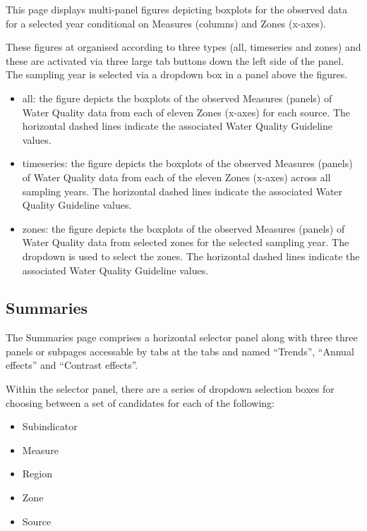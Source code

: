 \documentclass[
  8pt,
  a4paper]{article}
\providecommand{\tightlist}{%
  \setlength{\itemsep}{0pt}\setlength{\parskip}{0pt}}
\begin{document}
This page displays multi-panel figures depicting boxplots for the
observed data for a selected year conditional on Measures (columns) and
Zones (x-axes).

These figures at organised according to three types (all, timeseries and
zones) and these are activated via three large tab buttons down the left
side of the panel. The sampling year is selected via a dropdown box in a
panel above the figures.

\begin{itemize}
\tightlist
\item
  all: the figure depicts the boxplots of the observed Measures (panels)
  of Water Quality data from each of eleven Zones (x-axes) for each
  source. The horizontal dashed lines indicate the associated Water
  Quality Guideline values.
\item
  timeseries: the figure depicts the boxplots of the observed Measures
  (panels) of Water Quality data from each of the eleven Zones (x-axes)
  across all sampling years. The horizontal dashed lines indicate the
  associated Water Quality Guideline values.
\item
  zones: the figure depicts the boxplots of the observed Measures
  (panels) of Water Quality data from selected zones for the selected
  sampling year. The dropdown is used to select the zones. The
  horizontal dashed lines indicate the associated Water Quality
  Guideline values.
\end{itemize}

\subsection{Summaries}\label{summaries}

The Summaries page comprises a horizontal selector panel along with
three three panels or subpages accessable by tabs at the tabs and named
``Trends'', ``Annual effects'' and ``Contrast effects''.

Within the selector panel, there are a series of dropdown selection
boxes for choosing between a set of candidates for each of the
following:

\begin{itemize}
\tightlist
\item
  Subindicator
\item
  Measure
\item
  Region
\item
  Zone
\item
  Source
\end{itemize}
\end{document}
